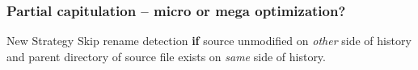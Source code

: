 \documentclass[compress,t]{beamer}
\begin{document}
\begin{frame}[fragile]

\end{frame}


\begin{frame}[fragile]
  \frametitle{Partial capitulation -- micro or mega optimization?}

  \vspace*{-1.5\baselineskip}
  \begin{center}
  \begin{minipage}{0.8\textwidth}
  \begin{block}{New Strategy}
    Skip rename detection \textbf{if} source unmodified on \textit{other}
    side of history and parent directory of source file exists
    on \textit{same} side of history.
  \end{block}
  \end{minipage}
  \end{center}


\end{frame}

\end{document}
